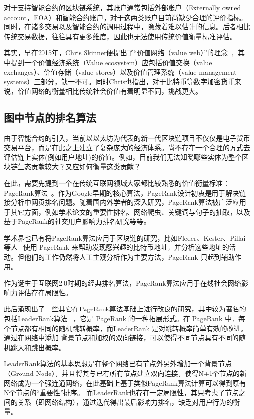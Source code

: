对于支持智能合约的区块链系统，其账户通常包括外部账户（Externally owned account，EOA）和智能合约账户，对于这两类账户目前尚缺少合理的评价指标。同时，在诸多交易以及智能合约的调用过程中，隐藏着难以估计的信息。后者相比传统交易数据，往往具有更多维度，因此也无法使用传统价值衡量标准评估。

其实，早在2015年，Chris Skinner便提出了“价值网络（value web）”的理念~\cite{ChrisSkinner}，其中提到一个价值经济系统（Value ecosystem）应包括价值交换（value exchanges）、价值存储（value stores）以及价值管理系统（value management systems）三部分，缺一不可。同时Chris也指出，对于比特币等数字加密货币来说，价值网络的衡量相比传统社会价值有着明显不同，挑战更大。






\subsection{图中节点的排名算法}
由于智能合约的引入，当前以以太坊为代表的新一代区块链项目不仅仅是电子货币交易平台，而是在此之上建立了复杂庞大的经济体系。尚不存在一个合理的方式去评估链上实体(例如用户地址)的价值。例如，目前我们无法知晓哪些实体为整个区块链生态贡献较大？又应如何衡量这类贡献？

在此，需要先提到一个在传统互联网领域大家都比较熟悉的价值衡量标准：PageRank算法~\cite{page1999pagerank}。作为Google早期的核心算法，PageRank设计初衷是用于解决链接分析中网页排名问题。随着国内外学者的深入研究，PageRank算法被广泛应用于其它方面，例如学术论文的重要性排名、网络爬虫、关键词与句子的抽取，以及基于PageRank的社交用户影响力排名研究等等。

学术界也已有将PageRank算法应用于区块链的研究，比如Fleder、Kester、Pillai等人~\cite{Fleder2015} 使用 PageRank 来帮助发现感兴趣的比特币地址，并分析这些地址的活 动。但他们的工作仍然将人工主观分析作为主要方法，PageRank 只起到辅助作用。

作为诞生于互联网2.0时期的经典排名算法，PageRank算法应用于在线社会网络影响力评估存在局限性。

此后涌现出了一些其它在PageRank算法基础上进行改良的研究，其中较为著名的包括LeaderRank算法 ~\cite{Li2014}，它是 PageRank 的一种拓展形式。在 PageRank 中，每个节点都有相同的随机跳转概率，而LeaderRank 是对跳转概率简单有效的改进。通过在网络中添加 背景节点和加权的双向链接，可以使得不同节点具有不同的随机跳入和跳出概率。

LeaderRank算法的基本思想是在整个网络已有节点外另外增加一个背景节点（Ground Node），并且将其与已有所有节点建立双向连接，使得N+1个节点的新网络成为一个强连通网络，在此基础上基于类似PageRank算法计算可以得到原有N个节点的“重要性”排序。
而LeaderRank也存在一定局限性，其只考虑了节点之间的关系（即网络结构），通过迭代得出最后影响力排名，缺乏对用户行为的衡量。

